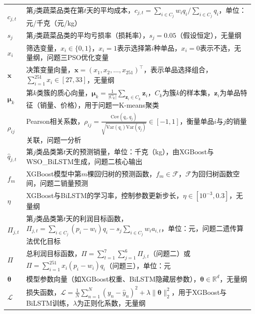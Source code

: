 \documentclass{cumcmthesis} %
\begin{document}
\begin{center}
\begin{longtable}{p{3.5cm}<{\centering} p{10cm}<{\centering}}
        $c_{j,t}$ & 第$j$类蔬菜品类在第$t$天的平均成本，$c_{j,t} = \sum_{i \in C_j} w_i q_i / \sum_{i \in C_j} q_i$，单位：元/千克（元/kg） \\
        
        $s_j$ & 第$j$类蔬菜品类的平均亏损率（损耗率），$s_j = 0.05$（假设恒定），无量纲 \\
        
        $x_i$ & 筛选变量，$x_i \in \{0,1\}$，$x_i=1$表示选择第$i$种单品，$x_i=0$表示不选，无量纲，问题三PSO优化变量 \\
        
        $\boldsymbol{x}$ & 决策变量向量，$\boldsymbol{x} = (x_1, x_2, \dots, x_{251})^\top$，表示单品选择组合，$\sum_{i=1}^{251} x_i \in [27,33]$，无量纲 \\
        
        $\boldsymbol{\mu}_k$ & 第$k$类簇的质心向量，$\boldsymbol{\mu}_k = \frac{1}{|C_k|} \sum_{\boldsymbol{z}_i \in C_k} \boldsymbol{z}_i$，$C_k$为簇$k$的样本集，$\boldsymbol{z}_i$为单品特征（销量、价格），用于问题一K-means聚类 \\
        
        $\rho_{ij}$ & Pearson相关系数，$\rho_{ij} = \frac{\text{Cov}(q_i, q_j)}{\sqrt{\text{Var}(q_i) \text{Var}(q_j)}} \in [-1,1]$，衡量单品$i$与$j$的销量关联，问题一分析 \\
        
        $\hat{q}_{j,t}$ & 第$j$类品类第$t$天的预测销量，单位：千克（kg），由XGBoost与WSO\_BiLSTM生成，问题二核心输出 \\
        
        $f_m$ & XGBoost模型中第$m$棵回归树的预测函数，$f_m \in \mathcal{F}$，$\mathcal{F}$为回归树函数空间，问题二销量预测  \\
        
        $\eta$ & XGBoost与BiLSTM的学习率，控制参数更新步长，$\eta \in [10^{-3}, 0.3]$，无量纲 \\
        
        $\Pi_{j,t}$ & 第$j$类品类第$t$天的利润目标函数，$\Pi_{j,t} = \sum_{i \in C_j} (p_i - w_i) q_i - s_j \sum_{i \in C_j} w_i a_{i,t}$，单位：元，问题二遗传算法优化目标 \\
        
        $\Pi$ & 总利润目标函数，$\Pi = \sum_{t=1}^7 \sum_{j=1}^6 \Pi_{j,t}$（问题二）或$\Pi = \sum_{i=1}^{251} x_i (p_i - w_i) q_i$（问题三），单位：元 \\
        
        $\boldsymbol{\theta}$ & 模型参数向量（如XGBoost权重、BiLSTM隐藏层参数），$\boldsymbol{\theta} \in \mathbb{R}^d$，无量纲  \\
        
        $\mathcal{L}$ & 损失函数，$\mathcal{L} = \frac{1}{N} \sum_{n=1}^N (y_n - \hat{y}_n)^2 + \lambda \|\boldsymbol{\theta}\|_2^2$，用于XGBoost与BiLSTM训练，$\lambda$为正则化系数，无量纲 \\
        
        \bottomrule[1.5pt]
    \end{longtable}
\end{center}
\end{document}
